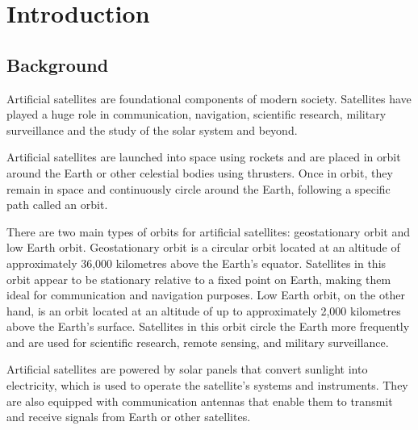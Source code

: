 \chapter{Introduction}

\justifying
\section{Background}

     Artificial satellites are foundational components of modern society. Satellites have played a huge role in communication, navigation, scientific research, military surveillance and the study of the solar system and beyond. 
     
     Artificial satellites are launched into space using rockets and are placed in orbit around the Earth or other celestial bodies using thrusters. Once in orbit, they remain in space and continuously circle around the Earth, following a specific path called an orbit.
     
     There are two main types of orbits for artificial satellites: geostationary orbit and low Earth orbit. Geostationary orbit is a circular orbit located at an altitude of approximately 36,000 kilometres above the Earth's equator. Satellites in this orbit appear to be stationary relative to a fixed point on Earth, making them ideal for communication and navigation purposes. Low Earth orbit, on the other hand, is an orbit located at an altitude of up to approximately 2,000 kilometres above the Earth's surface. Satellites in this orbit circle the Earth more frequently and are used for scientific research, remote sensing, and military surveillance.
     
     Artificial satellites are powered by solar panels that convert sunlight into electricity, which is used to operate the satellite's systems and instruments. They are also equipped with communication antennas that enable them to transmit and receive signals from Earth or other satellites.
     
\\

